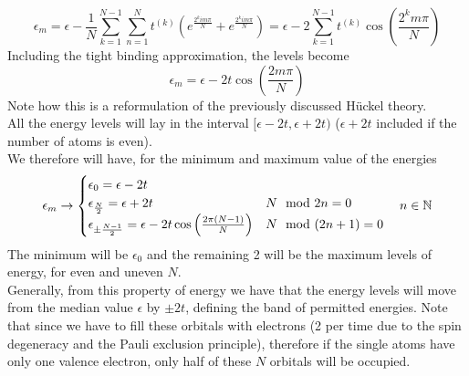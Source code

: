 \documentclass[../qm.tex]{subfiles}
\begin{document}
	\begin{equation*}
		\epsilon_m=\epsilon-\frac{1}{N}\sum_{k=1}^{N-1}\sum_{n=1}^Nt^{(k)}\left(e^{\frac{2^kim\pi}{N}}+e^{\frac{2^kim\pi}{N}}\right)=\epsilon-2\sum_{k=1}^{N-1}t^{(k)}\cos\left( \frac{2^km\pi}{N} \right)
	\end{equation*}
	Including the tight binding approximation, the levels become
	\begin{equation}
		\epsilon_m=\epsilon-2t\cos\left( \frac{2m\pi}{N} \right)
		\label{eq:tblevelncyc}
	\end{equation}
	Note how this is a reformulation of the previously discussed Hückel theory.\\
	All the energy levels will lay in the interval $[\epsilon-2t,\epsilon+2t)$ ($\epsilon+2t$ included if the number of atoms is even).\\
	We therefore will have, for the minimum and maximum value of the energies
	\begin{equation}
		\epsilon_m\to\begin{cases}
			\epsilon_0=\epsilon-2t\\
			\epsilon_{\frac{N}{2}}=\epsilon+2t&N\mod 2n=0\\
			\epsilon_{\pm\frac{N-1}{2}}=\epsilon-2t\cos\left( \frac{2\pi(N-1)}{N} \right)&N\mod(2n+1)=0
		\end{cases}\quad n\in\mathbb{N}
		\label{eq:minmaxenergies}
	\end{equation}
	The minimum will be $\epsilon_0$ and the remaining 2 will be the maximum levels of energy, for even and uneven $N$.\\
	Generally, from this property of energy we have that the energy levels will move from the median value $\epsilon$ by $\pm2t$, defining the band of permitted energies. Note that since we have to fill these orbitals with electrons (2 per time due to the spin degeneracy and the Pauli exclusion principle), therefore if the single atoms have only one valence electron, only half of these $N$ orbitals will be occupied.
\end{document}
